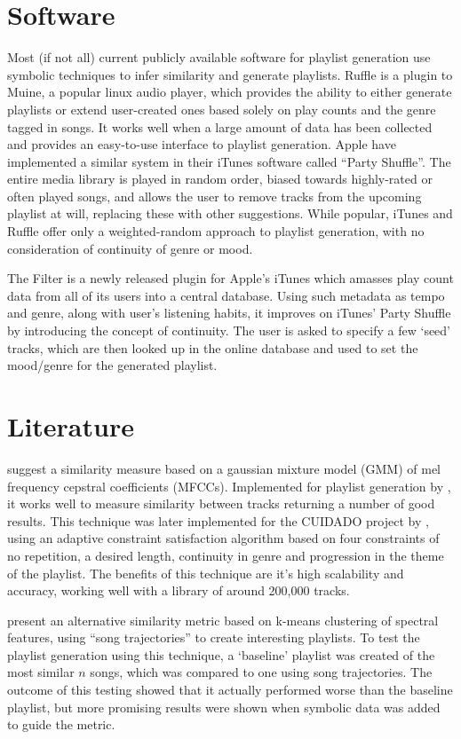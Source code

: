 \section{Software}
Most (if not all) current publicly available software for playlist generation use symbolic techniques to infer similarity and generate playlists. Ruffle is a plugin to Muine, a popular linux audio player, which provides the ability to either generate playlists or extend user-created ones based solely on play counts and the genre tagged in songs. It works well when a large amount of data has been collected and provides an easy-to-use interface to playlist generation. Apple have implemented a similar system in their iTunes software called ``Party Shuffle''. The entire media library is played in random order, biased towards highly-rated or often played songs, and allows the user to remove tracks from the upcoming playlist at will, replacing these with other suggestions. While popular, iTunes and Ruffle offer only a weighted-random approach to playlist generation, with no consideration of continuity of genre or mood.

The Filter is a newly released plugin for Apple's iTunes which amasses play count data from all of its users into a central database. Using such metadata as tempo and genre, along with user's listening habits, it improves on iTunes' Party Shuffle by introducing the concept of continuity. The user is asked to specify a few `seed' tracks, which are then looked up in the online database and used to set the mood/genre for the generated playlist.
\section{Literature}
\citet*{Aucouturier2002a} suggest a similarity measure based on a gaussian mixture model (GMM) of mel frequency cepstral coefficients (MFCCs). Implemented for playlist generation by \citet{Schnitzer2003}, it works well to measure similarity between tracks returning a number of good results. This technique was later implemented for the CUIDADO project by \citet*{Aucouturier2003}, using an adaptive constraint satisfaction algorithm based on four constraints of no repetition, a desired length, continuity in genre and progression in the theme of the playlist. The benefits of this technique are it's high scalability and accuracy, working well with a library of around 200,000 tracks.

\citet{Logan2001} present an alternative similarity metric based on k-means clustering of spectral features, using ``song trajectories'' to create interesting playlists. To test the playlist generation using this technique, a `baseline' playlist was created of the most similar $n$ songs, which was compared to one using song trajectories. The outcome of this testing showed that it actually performed worse than the baseline playlist, but more promising results were shown when symbolic data was added to guide the metric.

